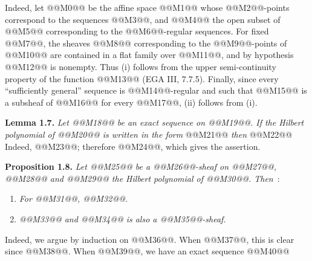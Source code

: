 Indeed, let @@M0@@ be the affine space @@M1@@ whose @@M2@@-points correspond to the sequences @@M3@@, and @@M4@@ the open subset of @@M5@@ corresponding to the @@M6@@-regular sequences. For fixed @@M7@@, the sheaves @@M8@@ corresponding to the @@M9@@-points of @@M10@@ are contained in a flat family over @@M11@@, and by hypothesis @@M12@@ is nonempty. Thus (i) follows from the upper semi-continuity property of the function @@M13@@ (EGA III, 7.7.5). Finally, since every ``sufficiently general'' sequence is @@M14@@-regular and such that @@M15@@ is a subsheaf of @@M16@@ for every @@M17@@, (ii) follows from (i).

\textbf{Lemma 1.7.} \emph{Let @@M18@@ be an exact sequence on @@M19@@. If the Hilbert polynomial of @@M20@@ is written in the form}
@@M21@@
\emph{then}
@@M22@@
Indeed, @@M23@@; therefore @@M24@@, which gives the assertion.

\textbf{Proposition 1.8.} \emph{Let @@M25@@ be a @@M26@@-sheaf on @@M27@@, @@M28@@ and @@M29@@ the Hilbert polynomial of @@M30@@. Then}~:
\begin{enumerate}[label=(\roman*)]
\item \emph{For @@M31@@, @@M32@@.}
\item \emph{@@M33@@ and @@M34@@ is also a @@M35@@-sheaf.}
\end{enumerate}
Indeed, we argue by induction on @@M36@@. When @@M37@@, this is clear since @@M38@@. When @@M39@@, we have an exact sequence
@@M40@@
